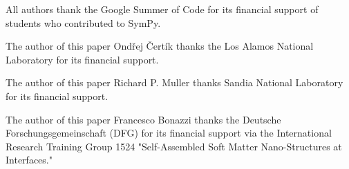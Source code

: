 All authors thank the Google Summer of Code for its financial support of
students who contributed to SymPy.

The author of this paper Ondřej Čertík thanks the Los Alamos National
Laboratory for its financial support.

The author of this paper Richard P. Muller thanks Sandia National Laboratory
for its financial support.

The author of this paper Francesco Bonazzi thanks the Deutsche
Forschungsgemeinschaft (DFG) for its financial support via the International
Research Training Group 1524 "Self-Assembled Soft Matter Nano-Structures at
Interfaces."
